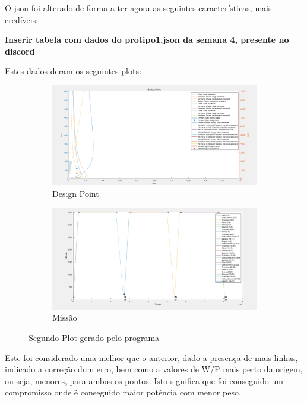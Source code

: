 O json foi alterado de forma a ter agora as seguintes características, mais credíveis:\par
{\Large{\textbf{Inserir tabela com dados do protipo1.json da semana 4, presente no discord}}}\par
Estes dados deram os seguintes plots:\par
\FloatBarrier
\begin{figure}[h]
    \centering
    \begin{subfigure}[h]{0.70\textwidth}
        \includegraphics[width=\textwidth]{Imagens/secondplot_designpoint.PNG}
        \caption{Design Point}
        \label{}
    \end{subfigure}
    \hfill
    \begin{subfigure}[h]{0.70\textwidth}
        \includegraphics[width=\textwidth]{Imagens/secondplot_misson.PNG}
        \caption{Missão}
        \label{}
    \end{subfigure}
    \caption{Segundo Plot gerado pelo programa}
    \label{firstplot}
\end{figure}
\FloatBarrier
Este foi considerado uma melhor que o anterior, dado a presença de mais linhas, indicado a correção dum erro, bem como a valores de W/P mais perto da origem, ou seja, menores, para ambos os pontos. Isto significa que foi conseguido um compromisso onde é conseguido maior potência com menor peso.\par
